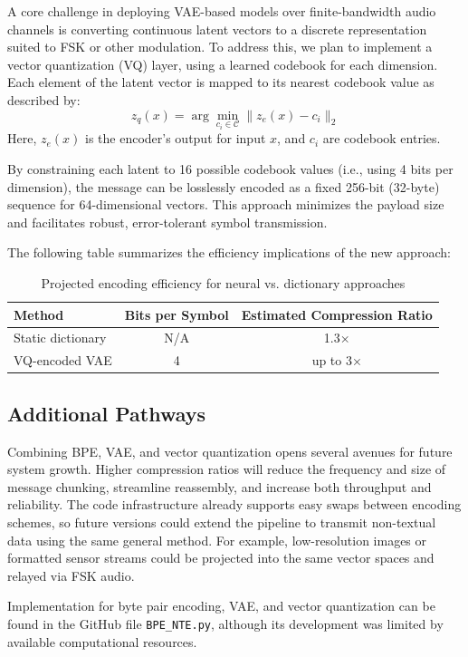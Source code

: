 \documentclass[12pt,openany]{article}
\theoremstyle{definition}
\theoremstyle{definition}
\theoremstyle{definition}
\begin{document}
A core challenge in deploying VAE-based models over finite-bandwidth audio channels is converting continuous latent vectors to a discrete representation suited to FSK or other modulation. To address this, we plan to implement a vector quantization (VQ) layer, using a learned codebook for each dimension. Each element of the latent vector is mapped to its nearest codebook value as described by:
\[
    z_q(x) = \arg\min_{c_i \in \mathcal{C}} \lVert z_e(x) - c_i \rVert_2
\]
Here, $z_e(x)$ is the encoder’s output for input $x$, and $c_i$ are codebook entries.

By constraining each latent to 16 possible codebook values (i.e., using 4 bits per dimension), the message can be losslessly encoded as a fixed 256-bit (32-byte) sequence for 64-dimensional vectors. This approach minimizes the payload size and facilitates robust, error-tolerant symbol transmission.

The following table summarizes the efficiency implications of the new approach:

\begin{table}[h]
    \centering
    \begin{tabular}{|l|c|c|}
    \hline
    \textbf{Method} & \textbf{Bits per Symbol} & \textbf{Estimated Compression Ratio} \\
    \hline
    Static dictionary & N/A & 1.3× \\
    VQ-encoded VAE    & 4   & up to 3× \\
    \hline
    \end{tabular}
    \caption{Projected encoding efficiency for neural vs. dictionary approaches}
\end{table}

\subsection*{Additional Pathways}

Combining BPE, VAE, and vector quantization opens several avenues for future system growth. Higher compression ratios will reduce the frequency and size of message chunking, streamline reassembly, and increase both throughput and reliability. The code infrastructure already supports easy swaps between encoding schemes, so future versions could extend the pipeline to transmit non-textual data using the same general method. For example, low-resolution images or formatted sensor streams could be projected into the same vector spaces and relayed via FSK audio.

Implementation for byte pair encoding, VAE, and vector quantization can be found in the GitHub file \lstinline{BPE_NTE.py}, although its development was limited by available computational resources.
\end{document}
